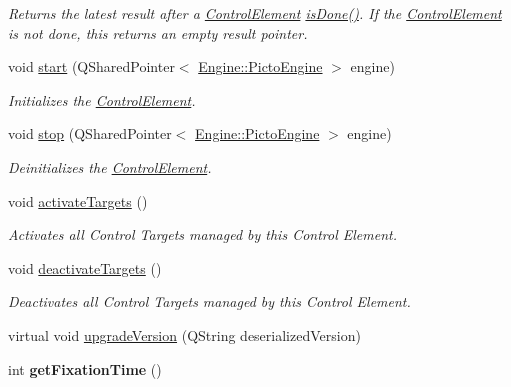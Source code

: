 \begin{DoxyCompactItemize}
\begin{DoxyCompactList}\small\item\em Returns the latest result after a \hyperlink{class_picto_1_1_control_element}{Control\-Element} \hyperlink{class_picto_1_1_choice_controller_abaa4d7f742e0678dc151da1a91be8b0c}{is\-Done()}. If the \hyperlink{class_picto_1_1_control_element}{Control\-Element} is not done, this returns an empty result pointer. \end{DoxyCompactList}\item 
void \hyperlink{class_picto_1_1_choice_controller_a25f1a01b67f68e192b9e19a8697618b7}{start} (Q\-Shared\-Pointer$<$ \hyperlink{class_picto_1_1_engine_1_1_picto_engine}{Engine\-::\-Picto\-Engine} $>$ engine)
\begin{DoxyCompactList}\small\item\em Initializes the \hyperlink{class_picto_1_1_control_element}{Control\-Element}. \end{DoxyCompactList}\item 
void \hyperlink{class_picto_1_1_choice_controller_a66e08d4e4deface099b85b9d085c6d58}{stop} (Q\-Shared\-Pointer$<$ \hyperlink{class_picto_1_1_engine_1_1_picto_engine}{Engine\-::\-Picto\-Engine} $>$ engine)
\begin{DoxyCompactList}\small\item\em Deinitializes the \hyperlink{class_picto_1_1_control_element}{Control\-Element}. \end{DoxyCompactList}\item 
void \hyperlink{class_picto_1_1_choice_controller_a3dfbf8664c1fd73b0f721871dc0fccad}{activate\-Targets} ()
\begin{DoxyCompactList}\small\item\em Activates all Control Targets managed by this Control Element. \end{DoxyCompactList}\item 
void \hyperlink{class_picto_1_1_choice_controller_a45208557f6ce245353971aa7bf22d36b}{deactivate\-Targets} ()
\begin{DoxyCompactList}\small\item\em Deactivates all Control Targets managed by this Control Element. \end{DoxyCompactList}\item 
virtual void \hyperlink{class_picto_1_1_choice_controller_a7ccbb75f73b3d06a368a344a9b0818d2}{upgrade\-Version} (Q\-String deserialized\-Version)
\item 
\hypertarget{class_picto_1_1_choice_controller_a43bdb03ae12e202c2b39a7d1120340e2}{int {\bfseries get\-Fixation\-Time} ()}\label{class_picto_1_1_choice_controller_a43bdb03ae12e202c2b39a7d1120340e2}


\end{DoxyCompactItemize}
